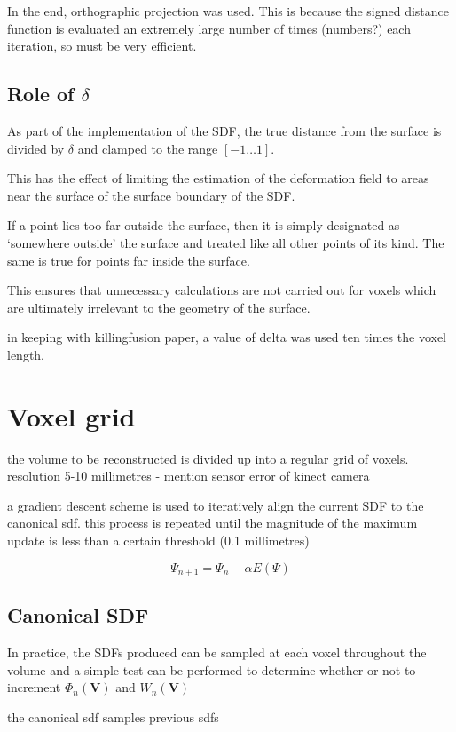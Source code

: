 \documentclass[12pt,twoside]{report}
\begin{document}
In the end, orthographic projection was used. This is because the signed distance function is evaluated an extremely large number of times (numbers?) each iteration, so must be very efficient.

\subsection{Role of $\delta$}

As part of the implementation of the SDF, the true distance from the surface is divided by $\delta$ and clamped to the range $[-1 \ldots 1]$.

This has the effect of limiting the estimation of the deformation field to areas near the surface of the surface boundary of the SDF. 

If a point lies too far outside the surface, then it is simply designated as `somewhere outside' the surface and treated like all other points of its kind. The same is true for points far inside the surface.

This ensures that unnecessary calculations are not carried out for voxels which are ultimately irrelevant to the geometry of the surface.

in keeping with killingfusion paper, a value of delta was used ten times the voxel length.


\section{Voxel grid}

the volume to be reconstructed is divided up into a regular grid of voxels. resolution 5-10 millimetres - mention sensor error of kinect camera

a gradient descent scheme is used to iteratively align the current SDF to the canonical sdf. this process is repeated until the magnitude of the maximum update is less than a certain threshold (0.1 millimetres)

$$\Psi_{n+1} = \Psi_n - \alpha E(\Psi)$$

\subsection{Canonical SDF}

In practice, the SDFs produced can be sampled at each voxel throughout the volume and a simple test can be performed to determine whether or not to increment $\Phi_n(\textbf{V})$ and $W_n(\textbf{V})$

the canonical sdf samples previous sdfs
\end{document}
